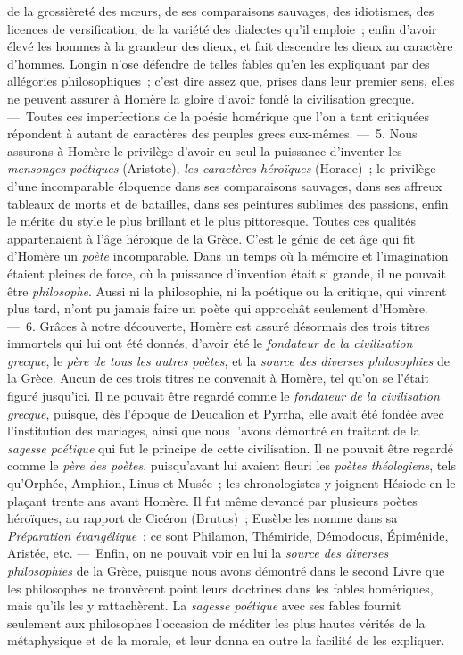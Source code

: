 \documentclass[french,twoside]{book} %
\begin{document}
de la grossièreté des mœurs, de ses comparaisons sauvages, des idiotismes, des licences de versification, de la variété des dialectes qu’il emploie ; enfin d’avoir élevé les hommes à la grandeur des dieux, et fait descendre les dieux au caractère d’hommes. Longin n’ose défendre de telles fables qu’en les expliquant par des allégories philosophiques ; c’est dire assez que, prises dans leur premier sens, elles ne peuvent assurer à Homère la gloire d’avoir fondé la civilisation grecque. — Toutes ces imperfections de la poésie homérique que l’on a  tant critiquées répondent à autant de caractères des peuples grecs eux-mêmes. — 5. Nous assurons à Homère le privilège d’avoir eu seul la puissance d’inventer les {\itshape mensonges poétiques} (Aristote), {\itshape les caractères héroïques} (Horace) ; le privilège d’une incomparable éloquence dans ses comparaisons sauvages, dans ses affreux tableaux de morts et de batailles, dans ses peintures sublimes des passions, enfin le mérite du style le plus brillant et le plus pittoresque. Toutes ces qualités appartenaient à l’âge héroïque de la Grèce. C’est le génie de cet âge qui fit d’Homère un {\itshape poète} incomparable. Dans un temps où la mémoire et l’imagination étaient pleines de force, où la puissance d’invention était si grande, il ne pouvait être {\itshape philosophe}. Aussi ni la philosophie, ni la poétique ou la critique, qui vinrent plus tard, n’ont pu jamais faire un poète qui approchât seulement d’Homère. — 6. Grâces à notre découverte, Homère est assuré désormais des trois titres immortels qui lui ont été donnés, d’avoir été le {\itshape fondateur de la civilisation grecque}, le {\itshape père de tous les autres poètes}, et la {\itshape source des diverses philosophies} de la Grèce. Aucun de ces trois titres ne convenait à Homère, tel qu’on se l’était figuré jusqu’ici. Il ne pouvait être regardé comme le {\itshape fondateur de la civilisation grecque}, puisque, dès l’époque de Deucalion et Pyrrha, elle avait été fondée avec l’institution des mariages, ainsi que nous l’avons démontré en traitant de la {\itshape sagesse poétique} qui fut le principe de cette civilisation. Il ne pouvait être regardé  comme le {\itshape père des poètes}, puisqu’avant lui avaient fleuri les {\itshape poètes théologiens}, tels qu’Orphée, Amphion, Linus et Musée ; les chronologistes y joignent Hésiode en le plaçant trente ans avant Homère. Il fut même devancé par plusieurs poètes héroïques, au rapport de Cicéron (Brutus) ; Eusèbe les nomme dans sa {\itshape Préparation évangélique} ; ce sont Philamon, Thémiride, Démodocus, Épiménide, Aristée, etc. — Enfin, on ne pouvait voir en lui la {\itshape source des diverses philosophies} de la Grèce, puisque nous avons démontré dans le second Livre que les philosophes ne trouvèrent point leurs doctrines dans les fables homériques, mais qu’ils les y rattachèrent. La {\itshape sagesse poétique} avec ses fables fournit seulement aux philosophes l’occasion de méditer les plus hautes vérités de la métaphysique et de la morale, et leur donna en outre la facilité de les expliquer.
\end{document}
